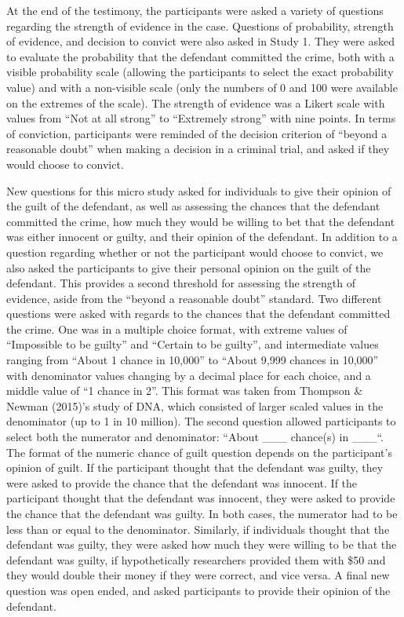 \documentclass[print]{nuthesis}
\begin{document}
At the end of the testimony, the participants were asked a variety of questions regarding the strength of evidence in the case.
Questions of probability, strength of evidence, and decision to convict were also asked in Study 1.
They were asked to evaluate the probability that the defendant committed the crime, both with a visible probability scale (allowing the participants to select the exact probability value) and with a non-visible scale (only the numbers of 0 and 100 were available on the extremes of the scale).
The strength of evidence was a Likert scale with values from ``Not at all strong'' to ``Extremely strong'' with nine points.
In terms of conviction, participants were reminded of the decision criterion of ``beyond a reasonable doubt'' when making a decision in a criminal trial, and asked if they would choose to convict.

New questions for this micro study asked for individuals to give their opinion of the guilt of the defendant, as well as assessing the chances that the defendant committed the crime, how much they would be willing to bet that the defendant was either innocent or guilty, and their opinion of the defendant.
In addition to a question regarding whether or not the participant would choose to convict, we also asked the participants to give their personal opinion on the guilt of the defendant.
This provides a second threshold for assessing the strength of evidence, aside from the ``beyond a reasonable doubt'' standard.
Two different questions were asked with regards to the chances that the defendant committed the crime.
One was in a multiple choice format, with extreme values of ``Impossible to be guilty'' and ``Certain to be guilty'', and intermediate values ranging from ``About 1 chance in 10,000'' to ``About 9,999 chances in 10,000'' with denominator values changing by a decimal place for each choice, and a middle value of ``1 chance in 2''.
This format was taken from Thompson \& Newman (2015)'s study of DNA, which consisted of larger scaled values in the denominator (up to 1 in 10 million).
The second question allowed participants to select both the numerator and denominator: ``About \_\_\_ chance(s) in \_\_\_``.
The format of the numeric chance of guilt question depends on the participant's opinion of guilt.
If the participant thought that the defendant was guilty, they were asked to provide the chance that the defendant was innocent.
If the participant thought that the defendant was innocent, they were asked to provide the chance that the defendant was guilty.
In both cases, the numerator had to be less than or equal to the denominator.
Similarly, if individuals thought that the defendant was guilty, they were asked how much they were willing to be that the defendant was guilty, if hypothetically researchers provided them with \$50 and they would double their money if they were correct, and vice versa.
A final new question was open ended, and asked participants to provide their opinion of the defendant.
\end{document}
